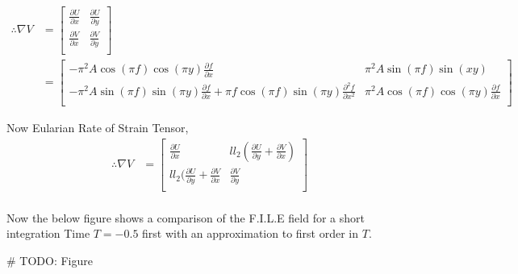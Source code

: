 \documentclass[../report.tex]{subfiles}
\begin{document}
\begin{equation}
  \begin{aligned}
    \therefore \nabla V &= \begin{bmatrix}
      \frac{\partial U}{\partial x} & \frac{\partial U}{\partial y} \\[12pt]
      \frac{\partial V}{\partial x} & \frac{\partial V}{\partial y} \\
    \end{bmatrix} \\
    &= \begin{bmatrix}
      -\pi^2 A\cos(\pi f)\cos(\pi y) \frac{\partial f}{\partial x} & \pi^2 A\sin(\pi f)\sin(xy) \\[12pt]
      -\pi^2 A\sin(\pi f)\sin(\pi y)\frac{\partial f}{\partial x} + \pi f\cos(\pi f)\sin(\pi y) \frac{\partial^2 f}{\partial x^2} & \pi^2 A\cos(\pi f)\cos(\pi y)\frac{\partial f}{\partial x} \\
    \end{bmatrix}
  \end{aligned}
\end{equation}

Now Eularian Rate of Strain Tensor,
\begin{equation}
  \begin{aligned}
    \therefore \nabla V &= \begin{bmatrix}
      \frac{\partial U}{\partial x} & ll_2(\frac{\partial U}{\partial y} + \frac{\partial V}{\partial x}) \\[12pt]
      ll_2(\frac{\partial U}{\partial y} + \frac{\partial V}{\partial x} & \frac{\partial V}{\partial y} \\
    \end{bmatrix} \\
  \end{aligned}
\end{equation}

Now the below figure shows a comparison of the F.I.L.E field for a short integration Time \(T = -0.5\) first with an approximation to first order in \(T\).

\# TODO: Figure
\end{document}
